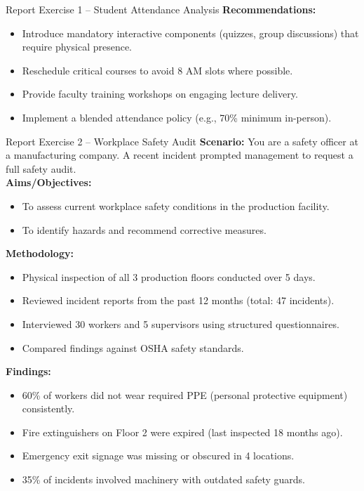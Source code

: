 \documentclass[12pt,a4paper]{article}
\begin{document}
\begin{exbox}{Report Exercise 1 -- Student Attendance Analysis}
\textbf{Recommendations:}
\begin{itemize}[noitemsep]
    \item Introduce mandatory interactive components (quizzes, group discussions) that require physical presence.
    \item Reschedule critical courses to avoid 8 AM slots where possible.
    \item Provide faculty training workshops on engaging lecture delivery.
    \item Implement a blended attendance policy (e.g., 70\% minimum in-person).
\end{itemize}
\end{exbox}

\begin{exbox}{Report Exercise 2 -- Workplace Safety Audit}
\textbf{Scenario:} You are a safety officer at a manufacturing company. A recent incident prompted management to request a full safety audit.\\[0.3cm]

\textbf{Aims/Objectives:}
\begin{itemize}[noitemsep]
    \item To assess current workplace safety conditions in the production facility.
    \item To identify hazards and recommend corrective measures.
\end{itemize}

\textbf{Methodology:}
\begin{itemize}[noitemsep]
    \item Physical inspection of all 3 production floors conducted over 5 days.
    \item Reviewed incident reports from the past 12 months (total: 47 incidents).
    \item Interviewed 30 workers and 5 supervisors using structured questionnaires.
    \item Compared findings against OSHA safety standards.
\end{itemize}

\textbf{Findings:}
\begin{itemize}[noitemsep]
    \item 60\% of workers did not wear required PPE (personal protective equipment) consistently.
    \item Fire extinguishers on Floor 2 were expired (last inspected 18 months ago).
    \item Emergency exit signage was missing or obscured in 4 locations.
    \item 35\% of incidents involved machinery with outdated safety guards.
\end{itemize}


\end{exbox}
\end{document}
